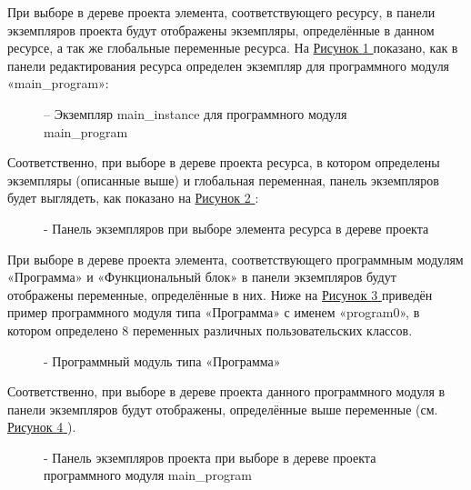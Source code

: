 \documentclass[letterpaper,10pt,russian]{sphinxmanual}
\begin{document}
При выборе в дереве проекта элемента, соответствующего ресурсу, в панели
экземпляров проекта будут отображены экземпляры,
определённые в данном ресурсе, а так же глобальные переменные ресурса.
На \hyperref[usage_guide/ide_components:image125]{Рисунок \ref{usage_guide/ide_components:image125} } показано, как в панели редактирования ресурса определен
экземпляр для программного модуля «main\_program»:
\begin{figure}[htbp]
\centering
\capstart

\noindent{}
\caption{– Экземпляр main\_instance для программного модуля main\_program}\label{usage_guide/ide_components:image125}\end{figure}

Соответственно, при выборе в дереве проекта ресурса, в котором
определены экземпляры (описанные выше) и глобальная переменная, панель
экземпляров будет выглядеть, как показано на \hyperref[usage_guide/ide_components:image126]{Рисунок \ref{usage_guide/ide_components:image126} }:
\begin{figure}[htbp]
\centering
\capstart

\noindent{}
\caption{- Панель экземпляров при выборе элемента ресурса в дереве проекта}\label{usage_guide/ide_components:image126}\end{figure}

При выборе в дереве проекта элемента, соответствующего программным
модулям «Программа» и «Функциональный блок» в панели экземпляров будут
отображены переменные, определённые в них. Ниже на \hyperref[usage_guide/ide_components:image127]{Рисунок \ref{usage_guide/ide_components:image127} } приведён
пример программного модуля типа «Программа» с именем «program0», в
котором определено 8 переменных различных пользовательских классов.
\begin{figure}[htbp]
\centering
\capstart

\noindent{}
\caption{- Программный модуль типа «Программа»}\label{usage_guide/ide_components:image127}\end{figure}

Соответственно, при выборе в дереве проекта данного программного модуля
в панели экземпляров будут отображены, определённые выше переменные
(см. \hyperref[usage_guide/ide_components:image128]{Рисунок \ref{usage_guide/ide_components:image128} }).
\begin{figure}[htbp]
\centering
\capstart

\noindent{}
\caption{- Панель экземпляров проекта при выборе в дереве проекта программного модуля main\_program}\label{usage_guide/ide_components:image128}\end{figure}
\end{document}
